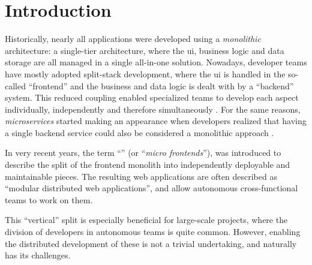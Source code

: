 
\chapter{Introduction}
\label{ch:introduction}




Historically, nearly all applications were developed using a
\textit{\gls{monolithic}} architecture: a single-tier architecture, where the
\gls{ui}, business logic and data storage are all managed in a single all-in-one
solution. Nowadays, developer teams have mostly adopted split-stack development,
where the \gls{ui} is handled in the so-called ``\gls{frontend}'' and the
business and data logic is dealt with by a ``\gls{backend}'' system. This
reduced coupling enabled specialized teams to develop each aspect individually,
independently and therefore simultaneously \autocite{Dunkley_2016}. For the same
reasons, \textit{microservices} started making an appearance when developers
realized that having a single backend service could also be considered a
monolithic approach \autocite{Fowler_Microservices_2014}.

In very recent years, the term ``\textit{}'' (or
``\textit{micro frontends}''), was introduced to describe the split of the
frontend \gls{monolith} into independently deployable and maintainable pieces.
The resulting web applications are often described as ``modular distributed web
applications'', and allow autonomous cross-functional teams to work on them.

This ``vertical'' split is especially beneficial for large-scale projects, where
the division of developers in autonomous teams is quite common. However,
enabling the distributed development of these  is not a
trivial undertaking, and naturally has its challenges.

